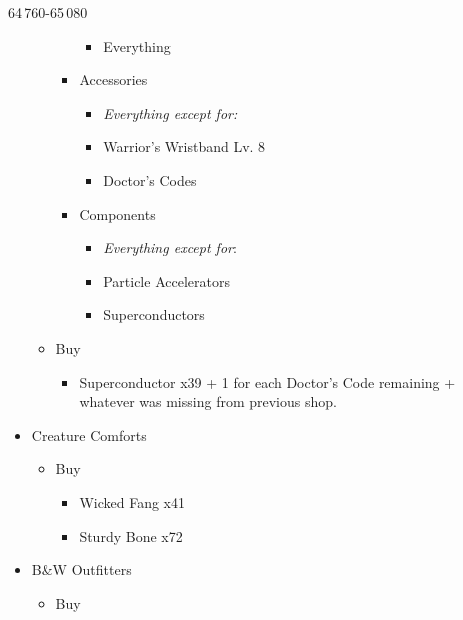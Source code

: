 \begin{multicols}{2}
\begin{shop}{64\,760-65\,080}
\begin{itemize}
\begin{itemize}
\begin{itemize}
\begin{itemize}
                              \item Everything
                            \end{itemize}
                      \item Accessories
                            \begin{itemize}
                              \item \textit{Everything except for:}
                              \item Warrior's Wristband Lv. 8
                              \item Doctor's Codes
                            \end{itemize}
                      \item Components
                            \begin{itemize}
                              \item \textit{Everything except for}:
                              \item Particle Accelerators
                              \item Superconductors
                            \end{itemize}
                    \end{itemize}
              \item Buy
                    \begin{itemize}
                      \item Superconductor x39 + 1 for each Doctor's Code remaining + whatever was missing from previous shop.
                    \end{itemize}
            \end{itemize}
      \item Creature Comforts
            \begin{itemize}
              \item Buy
                    \begin{itemize}
                      \item Wicked Fang x41
                      \item Sturdy Bone x72
                    \end{itemize}
            \end{itemize}
      \item B\&W Outfitters
            \begin{itemize}
              \item Buy
                    \begin{itemize}

\end{itemize}
\end{itemize}
\end{itemize}
\end{shop}
\end{multicols}
